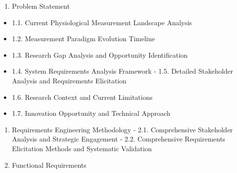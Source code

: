 \documentclass[11pt,a4paper]{report}
\begin{document}
\begin{enumerate}
\item Problem Statement
\end{enumerate}
\begin{itemize}
\item 1.1. Current Physiological Measurement Landscape Analysis
\item 1.2. Measurement Paradigm Evolution Timeline
\item 1.3. Research Gap Analysis and Opportunity Identification
\item 1.4. System Requirements Analysis Framework
    -
    1.5. Detailed Stakeholder Analysis and Requirements Elicitation
\item 1.6. Research Context and Current Limitations
\item 1.7. Innovation Opportunity and Technical Approach
\end{itemize}
\begin{enumerate}
\item Requirements Engineering Methodology
    -
    2.1. Comprehensive Stakeholder Analysis and Strategic Engagement
    -
    2.2. Comprehensive Requirements Elicitation Methods and Systematic Validation
\item Functional Requirements
\end{enumerate}
\end{document}
